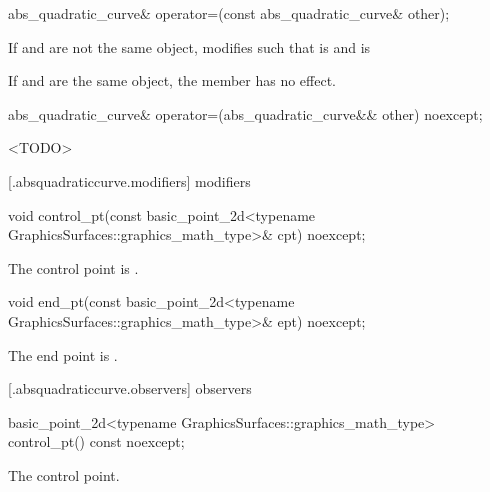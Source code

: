 %
\begin{itemdecl}
abs_quadratic_curve& operator=(const abs_quadratic_curve& other);
\end{itemdecl}
\begin{itemdescr}
\pnum
\effects
If  and  are not the same object, modifies  such that  is  and  is 

\pnum
If  and  are the same object, the member has no effect.

\pnum
\returns
{}
\end{itemdescr}

%
\begin{itemdecl}
abs_quadratic_curve& operator=(abs_quadratic_curve&& other) noexcept;
\end{itemdecl}
\begin{itemdescr}
\pnum
\effects
<TODO>

\pnum
\returns
{}
\end{itemdescr}

 [\iotwod.absquadraticcurve.modifiers]{ modifiers}

%
\begin{itemdecl}
void control_pt(const basic_point_2d<typename GraphicsSurfaces::graphics_math_type>& cpt) noexcept;
\end{itemdecl}
\begin{itemdescr}
\pnum
\effects
The control point is .
\end{itemdescr}

%
\begin{itemdecl}
void end_pt(const basic_point_2d<typename GraphicsSurfaces::graphics_math_type>& ept) noexcept;
\end{itemdecl}
\begin{itemdescr}
\pnum
\effects
The end point is .
\end{itemdescr}

 [\iotwod.absquadraticcurve.observers]{ observers}

%
\begin{itemdecl}
basic_point_2d<typename GraphicsSurfaces::graphics_math_type> control_pt() const noexcept;
\end{itemdecl}
\begin{itemdescr}
\pnum
\returns
The control point.
\end{itemdescr}

